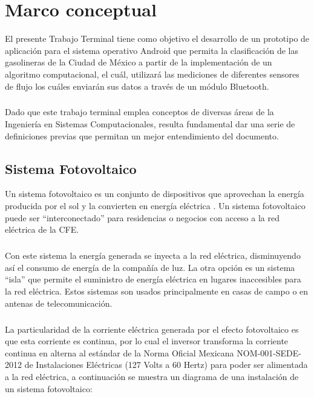 
\chapter{Marco conceptual}\label{chapter2}
El presente Trabajo Terminal tiene como objetivo el desarrollo de un prototipo de aplicación para el sistema operativo Android que permita la clasificación de las gasolineras de la Ciudad de México a partir de la implementación de un algoritmo computacional, el cuál, utilizará las mediciones de diferentes sensores de flujo los cuáles enviarán sus datos a través de un módulo Bluetooth.
\paragraph{}
Dado que este trabajo terminal emplea conceptos de diversas áreas de la Ingeniería en Sistemas Computacionales, resulta fundamental dar una serie de definiciones previas que permitan un mejor entendimiento del documento.

\section{Sistema Fotovoltaico}
Un sistema fotovoltaico es un conjunto de dispositivos que aprovechan la energía producida por el sol y la convierten en energía eléctrica \citep{MarcoTeorico1}. Un sistema fotovoltaico puede ser “interconectado” para residencias o negocios con acceso a la red eléctrica de la CFE. 
\paragraph{}
Con este sistema la energía generada se inyecta a la red eléctrica, disminuyendo así el consumo de energía de la compañía de luz. La otra opción es un sistema “isla” que permite el suministro de energía eléctrica en lugares inaccesibles para la red eléctrica. Estos sistemas son usados principalmente en casas de campo o en antenas de telecomunicación.
\paragraph{}
La particularidad de la corriente eléctrica generada por el efecto fotovoltaico es que esta corriente es continua, por lo cual el inversor transforma la corriente continua en alterna al estándar de la Norma Oficial Mexicana NOM-001-SEDE-2012 de Instalaciones Eléctricas (127 Volts a 60 Hertz) \citep{NORMA-Electrica} para poder ser alimentada a la red eléctrica, a continuación se muestra un diagrama de una instalación de un sistema fotovoltaico:


